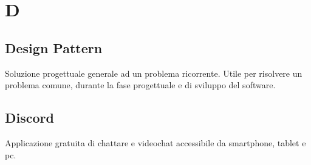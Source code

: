 \section{D}

\subsection{Design Pattern}
Soluzione progettuale generale ad un problema ricorrente. Utile per risolvere un problema comune, durante la fase progettuale e di sviluppo del software.


\subsection{Discord}
Applicazione gratuita di chattare e videochat accessibile da smartphone, tablet e pc.


\clearpage